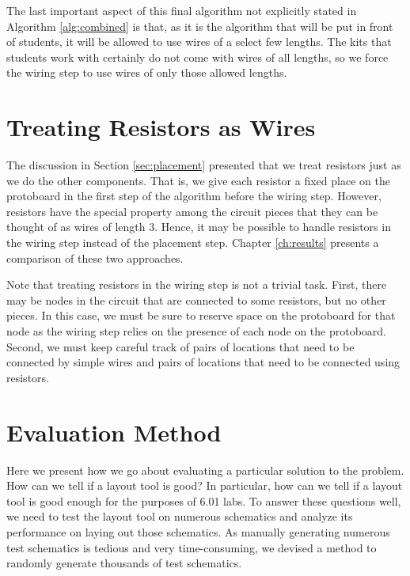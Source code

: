The last important aspect of this final algorithm not explicitly stated in
Algorithm \ref{alg:combined} is that, as it is the algorithm that will be put
in front of students, it will be allowed to use wires of a select few lengths.
The kits that students work with certainly do not come with wires of all lengths,
so we force the wiring step to use wires of only those allowed lengths.

\section{Treating Resistors as Wires}
\label{sec:resistors_as_wires}

The discussion in Section \ref{sec:placement} presented that we treat
resistors just as we do the other components. That is, we give each resistor a
fixed place on the protoboard in the first step of the algorithm before the
wiring step. However, resistors have the special property among the circuit
pieces that they can be thought of as wires of length $3$.
Hence, it may be possible to handle resistors in the wiring step instead of the
placement step. Chapter \ref{ch:results} presents a comparison of these two
approaches.

Note that treating resistors in the wiring step is not a trivial task. First,
there may be nodes in the circuit that are connected to some resistors, but no
other pieces. In this case, we must be sure to reserve space on the protoboard
for that node as the wiring step relies on the presence of each node on the
protoboard. Second, we must keep careful track of pairs of locations that need
to be connected by simple wires and pairs of locations that need to be connected
using resistors.

\section{Evaluation Method}

Here we present how we go about evaluating a particular solution to the problem.
How can we tell if a layout tool is good? In particular, how can we tell if a
layout tool is good enough for the purposes of 6.01 labs. To answer these
questions well, we need to test the layout tool on numerous schematics and
analyze its performance on laying out those schematics. As manually generating
numerous test schematics is tedious and very time-consuming, we devised a method
to randomly generate thousands of test schematics.

